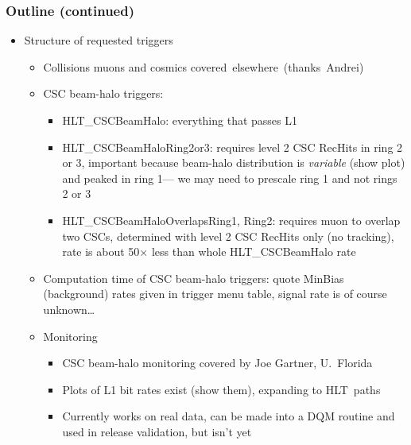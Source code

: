 \documentclass[compress]{beamer}
\begin{document}
\begin{frame}
\frametitle{Outline (continued)}
\begin{itemize}

\item Structure of requested triggers
\begin{itemize}
\item Collisions muons and cosmics \mbox{covered elsewhere (thanks Andrei)\hspace{-1 cm}}
\item CSC beam-halo triggers:
\begin{itemize}
\item HLT\_CSCBeamHalo: everything that passes L1
\item HLT\_CSCBeamHaloRing2or3: requires level 2 CSC RecHits in ring 2 or 3, important because beam-halo distribution is {\it variable} (show plot) and peaked in ring 1--- we may need to prescale ring 1 and not rings 2 or 3
\item HLT\_CSCBeamHaloOverlapsRing1, Ring2: requires muon to overlap two CSCs, determined with level 2 CSC RecHits only (no tracking), rate is about 50$\times$ less than whole HLT\_CSCBeamHalo rate
\end{itemize}

\item Computation time of CSC beam-halo triggers: quote MinBias (background) rates given in trigger menu table, signal rate is of course unknown\ldots

\item Monitoring
\begin{itemize}
\item CSC beam-halo monitoring covered by Joe Gartner, U.\ Florida
\item Plots of L1 bit rates exist (show them), expanding to \mbox{HLT paths\hspace{-1 cm}}
\item Currently works on real data, can be made into a DQM routine and used in release validation, but isn't yet
\end{itemize}

\end{itemize}
\end{itemize}
\label{numpages}
\end{frame}


\end{document}
